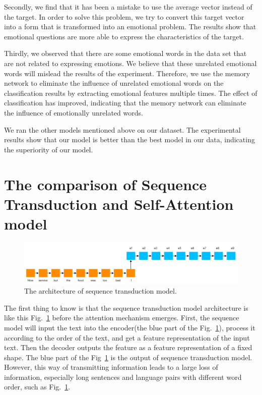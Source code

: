 \documentclass[runningheads, twocolumn]{llncs}
\begin{document}
Secondly, we find that it has been a mistake to use the average vector instead of the target. In order to solve this problem, we try to convert this target vector into a form that is transformed into an emotional problem. The results show that emotional questions are more able to express the characteristics of the target. 

Thirdly, we observed that there are some emotional words in the data set that are not related to expressing emotions. We believe that these unrelated emotional words will mislead the results of the experiment. Therefore, we use the memory network to eliminate the influence of unrelated emotional words on the classification results by extracting emotional features multiple times. The effect of classification has improved, indicating that the memory network can eliminate the influence of emotionally unrelated words. 

We ran the other models mentioned above on our dataset. The experimental results show that our model is better than the best model in our data, indicating the superiority of our model.

\section{The comparison of Sequence Transduction and Self-Attention model}

\begin{figure}[htb]
	\includegraphics[width=\textwidth]{rnn4.jpg}
	\centering
	\caption{The architecture of sequence transduction model.}\label{seq2seq}
\end{figure}
The first thing to know is that the sequence transduction model architecture is like this Fig.~\ref{seq2seq} before the attention mechanism emerges. First, the sequence model will input the text into the encoder(the blue part of the Fig.~\ref{seq2seq}), process it according to the order of the text, and get a feature representation of the input text. Then the decoder outputs the feature as a feature representation of a fixed shape. The blue part of the Fig~\ref{seq2seq} is the output of sequence transduction model. However, this way of transmitting information leads to a large loss of information, especially long sentences and language pairs with different word order, such as Fig.~\ref{seq2seq}.
\end{document}
